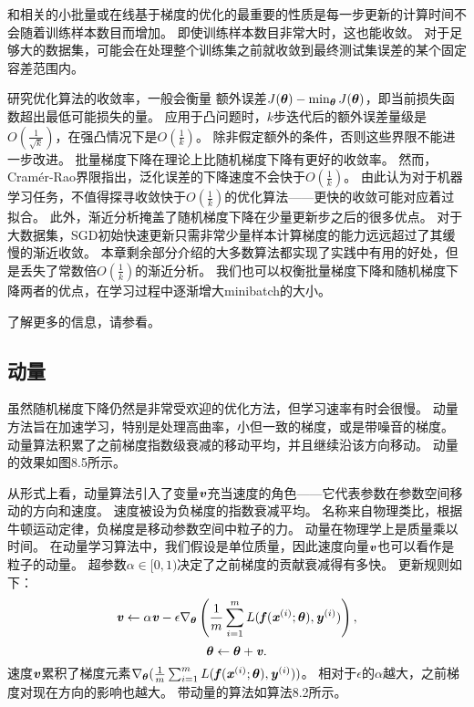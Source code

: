 和相关的小批量或在线基于梯度的优化的最重要的性质是每一步更新的计算时间不会随着训练样本数目而增加。
即使训练样本数目非常大时，这也能收敛。
对于足够大的数据集，可能会在处理整个训练集之前就收敛到最终测试集误差的某个固定容差范围内。

研究优化算法的收敛率，一般会衡量 额外误差$J(\boldsymbol{\theta}) - \min_{\boldsymbol{\theta}} J(\boldsymbol{\theta})$，即当前损失函数超出最低可能损失的量。
应用于凸问题时，$k$步迭代后的额外误差量级是$O(\frac{1}{\sqrt{k}})$，在强凸情况下是$O(\frac{1}{k})$。
除非假定额外的条件，否则这些界限不能进一步改进。
批量梯度下降在理论上比随机梯度下降有更好的收敛率。
然而，Cram\'er-Rao界限\citep{Cramer-1946,Rao-1945}指出，泛化误差的下降速度不会快于$O(\frac{1}{k})$。
\cite{bottou-bousquet-2008-small}由此认为对于机器学习任务，不值得探寻收敛快于$O(\frac{1}{k})$的优化算法——更快的收敛可能对应着过拟合。
此外，渐近分析掩盖了随机梯度下降在少量更新步之后的很多优点。
对于大数据集，SGD初始快速更新只需非常少量样本计算梯度的能力远远超过了其缓慢的渐近收敛。
本章剩余部分介绍的大多数算法都实现了实践中有用的好处，但是丢失了常数倍$O(\frac{1}{k})$的渐近分析。
我们也可以权衡批量梯度下降和随机梯度下降两者的优点，在学习过程中逐渐增大\gls{minibatch}的大小。


了解更多的信息，请参看\cite{Bottou98}。

\subsection{动量}
\label{sec:momentum}
虽然随机梯度下降仍然是非常受欢迎的优化方法，但学习速率有时会很慢。
动量方法\citep{polyak1964some}旨在加速学习，特别是处理高曲率，小但一致的梯度，或是带噪音的梯度。
动量算法积累了之前梯度指数级衰减的移动平均，并且继续沿该方向移动。
动量的效果如图8.5所示。

从形式上看，动量算法引入了变量$\boldsymbol{\mathit{v}}$充当速度的角色——它代表参数在参数空间移动的方向和速度。
速度被设为负梯度的指数衰减平均。
名称来自物理类比，根据牛顿运动定律，负梯度是移动参数空间中粒子的力。
动量在物理学上是质量乘以时间。
在动量学习算法中，我们假设是单位质量，因此速度向量$\boldsymbol{\mathit{v}}$也可以看作是粒子的动量。
超参数$\alpha\in[0,1)$决定了之前梯度的贡献衰减得有多快。
更新规则如下：
\begin{equation}
\boldsymbol{\mathit{v}} \leftarrow \alpha \boldsymbol{\mathit{v}} - \epsilon \nabla_{\boldsymbol{\theta}} \left( \frac{1}{m} \sum_{i=1}^m  L(\boldsymbol{\mathit{f}}(\boldsymbol{\mathit{x}}^{(i)}; \boldsymbol{\theta}), \boldsymbol{\mathit{y}}^{(i)}   )  \right),
\end{equation}
\begin{equation}
\boldsymbol{\theta} \leftarrow \boldsymbol{\theta}  + \boldsymbol{\mathit{v}} .
\end{equation}
速度$\boldsymbol{\mathit{v}}$累积了梯度元素$\nabla_{\boldsymbol{\theta}}( \frac{1}{m} \sum_{i=1}^m L( \boldsymbol{\mathit{f}}(\boldsymbol{\mathit{x}}^{(i)}; \boldsymbol{\theta}), \boldsymbol{\mathit{y}}^{(i)} )  )$。
相对于$\epsilon$的$\alpha$越大，之前梯度对现在方向的影响也越大。
带动量的算法如算法8.2所示。

